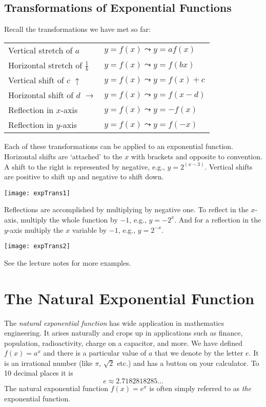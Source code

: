 \subsection*{Transformations of Exponential Functions}
Recall the transformations we have met so far:
\begin{center}
\begin{tabular}{ll}Vertical stretch of $a$  & $y =f (x) \leadsto y =a f (x)$  \\
	Horizontal stretch of $\frac{1}{b}$  & $y =f (x) \leadsto y =f (b x)$  \\
	Vertical shift of $c$ $\uparrow $  & $y =f (x) \leadsto y =f (x) +c$  \\
	Horizontal shift of $d$ $ \longrightarrow $  & $y =f (x) \leadsto y =f (x -d)$  \\
	Reflection in $x$-axis  & $y =f (x) \leadsto y = -f (x)$  \\
	Reflection in $y$-axis  & $y =f (x) \leadsto y =f ( -x)$
\end{tabular}
\end{center}
Each of these transformations can be applied to an exponential function. Horizontal shifts are `attached' to the $x$ with brackets and opposite to convention. A shift to the right is represented by negative, e.g., $y=2^(x-3)$. Vertical shifts are positive to shift up and negative to shift down.
\begin{center}\texttt{[image: expTrans1]}\end{center}
Reflections are accomplished by multiplying by negative one. To reflect in the $x$-axis, multiply the whole function by $-1$, e.g., $y=-2^x$. And for a reflection in the $y$-axis multiply the $x$ variable by $-1$, e.g., $y=2^{-x}$.
\begin{center}\texttt{[image: expTrans2]}\end{center}
See the lecture notes for more examples.
\section[$e^x$]{The Natural Exponential Function}\label{sec:naturalExponential}
The \emph{natural exponential function} has wide application in mathematics engineering. It arises naturally and crops up in applications such as finance, population, radioactivity, charge on a capacitor, and more. We have defined $f (x) =a^x$ and there is a particular value of $a$ that we denote by the letter $e$. It is an irrational number (like $\pi $, $\sqrt{2}$ etc.) and has a button on your calculator. To 10 decimal places it is
\[e \approx 2.7182818285\dots\]
The natural exponential function $f (x) =e^x$ is often simply referred to as \textit{the} exponential function. 

